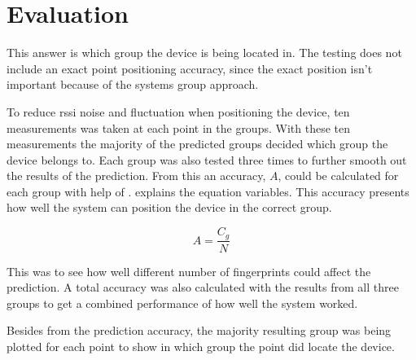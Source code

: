 \section{Evaluation}\label{sec:methodEvaluation}
This answer is which group the device is being located in.
The testing does not include an exact point positioning accuracy, since the exact position isn't important because of the systems group approach.

\bigskip

To reduce \acrshort{rssi} noise and fluctuation when positioning the device, ten measurements was taken at each point in the groups.
With these ten measurements the majority of the predicted groups decided which group the device belongs to.
Each group was also tested three times to further smooth out the results of the prediction.
From this an accuracy, $A$, could be calculated for each group with help of .
 explains the equation variables.
This accuracy presents how well the system can position the device in the correct group.

\begin{equation}\label{eq:evaluation}	
	A = \frac{C_g}{N}
\end{equation}


This was to see how well different number of fingerprints could affect the prediction.
A total accuracy was also calculated with the results from all three groups to get a combined performance of how well the system worked.

\bigskip

Besides from the prediction accuracy, the majority resulting group was being plotted for each point to show in which group the point did locate the device.
